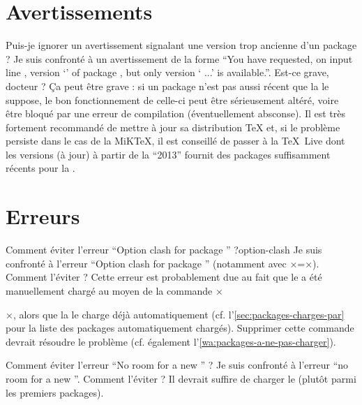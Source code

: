 \section{Avertissements}
\label{sec:avertissements}

\begin{dbfaq}{Puis-je ignorer un avertissement signalant une version trop
    ancienne d'un package ?}{}
  Je suis confronté à un avertissement de la forme \enquote{You have requested,
    on input line , version `' of package
    , but only version ` ...'
    is available.}. Est-ce grave, docteur ?
  \tcblower
  Ça peut être grave : si un package n'est pas aussi récent que la \yatcl le
  suppose, le bon fonctionnement de celle-ci peut être sérieusement altéré,
  voire être bloqué par une erreur de compilation (éventuellement absconse). Il
  est très fortement recommandé de mettre à jour sa distribution \TeX{} et, si
  le problème persiste dans le cas de la MiK\TeX{}, il est conseillé de passer
  à la \TeX~Live dont les versions (à jour) à partir de la \enquote{2013}
  fournit des packages suffisamment récents pour la \yatcl.
\end{dbfaq}

\section{Erreurs}
\label{sec:erreurs}

\begin{dbfaq}{Comment éviter l'erreur \enquote{Option clash for package
      } ?}{option-clash}
  Je suis confronté à l'erreur \enquote{Option clash for package
    } (notamment avec ×=×). Comment
  l'éviter ?
  \tcblower
  Cette erreur est probablement due au fait que le  a été
  manuellement chargé au moyen de la commande
  ×\usepackage[...]{×\meta{package}×}×, alors que la \yatcl{} le charge déjà
  automatiquement (cf. l'\vref{sec:packages-charges-par} pour la liste des
  packages automatiquement chargés). Supprimer cette commande devrait résoudre
  le problème (cf. également l'\vref{wa:packages-a-ne-pas-charger}).
\end{dbfaq}

\begin{dbfaq}{Comment éviter l'erreur \enquote{No room for a new
      \protect{}} ?}{}
  Je suis confronté à l'erreur \enquote{no room for a new
    }. Comment l'éviter ?
  \tcblower
  Il devrait suffire de charger le  (plutôt parmi les
  premiers packages).
\end{dbfaq}

